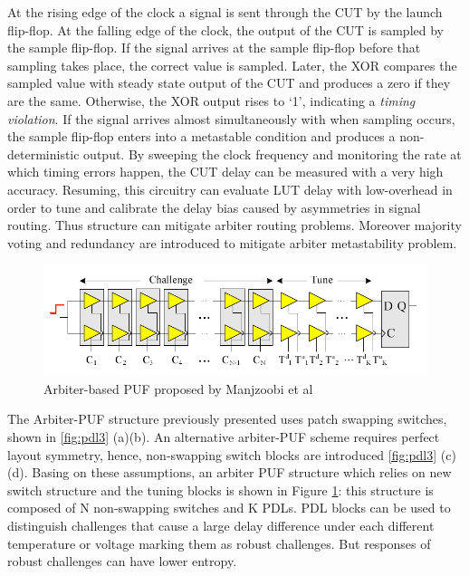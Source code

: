 \documentclass[../tesi.tex]{subfiles}
\begin{document}
At the rising edge of the clock a signal is sent through the CUT by the launch flip-flop. At the falling edge of the clock, the output of the CUT is sampled by the sample flip-flop.
If the signal arrives at the sample flip-flop before that sampling takes place, the correct value is sampled. Later, the XOR compares the sampled value with steady state output of the CUT and produces a zero if they are the same. Otherwise, the XOR output rises to ‘1’, indicating a \emph{timing violation}. If the signal arrives almost simultaneously with when sampling occurs, the sample flip-flop enters into a metastable condition and produces a non-deterministic output. By sweeping the clock frequency and monitoring the rate at which timing errors happen, the CUT delay can be measured with a very high accuracy. Resuming, this circuitry can evaluate LUT delay with low-overhead in order to tune and calibrate the delay bias caused by asymmetries in signal routing. Thus structure can mitigate arbiter routing problems. Moreover majority voting and redundancy are introduced to mitigate arbiter metastability problem. 
\begin{figure}
\centering
\includegraphics[scale=0.50]{images/improvedarbiter.png}
\caption{Arbiter-based PUF proposed by Manjzoobi et al}
\label{fig:improvedarbiter}
\end{figure}
The Arbiter-PUF structure previously presented uses patch swapping switches, shown in \ref{fig:pdl3} (a)(b). An alternative arbiter-PUF scheme requires perfect layout symmetry, hence, non-swapping switch blocks are introduced \ref{fig:pdl3} (c)(d). 
Basing on these assumptions, an arbiter PUF structure which relies on new switch structure and the tuning blocks is shown in Figure \ref{fig:improvedarbiter}: this structure is composed of N non-swapping switches and K PDLs. 
PDL blocks can be used to distinguish challenges that cause a large delay difference under each different temperature or voltage marking them as robust challenges. But responses of robust challenges can have lower entropy. 
\end{document}
